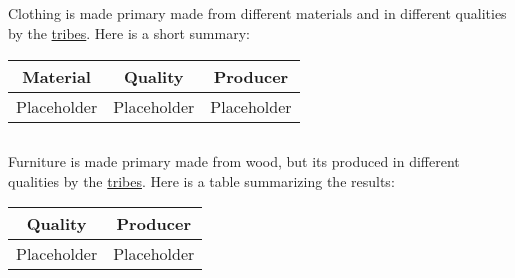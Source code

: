 \subsection{}\label{ch:Goods:Merchandise:Clothing}

\Gls{Clothing} is made primary made from different materials and in different qualities by the
\hyperref[ch:Tribes]{tribes}. Here is a short summary:

\begin{longtable}{ccc}
	\toprule
	Material    & Quality     & Producer    \\
	\midrule
	Placeholder & Placeholder & Placeholder \\
	\bottomrule
\end{longtable}

\subsection{}\label{ch:Goods:Merchandise:Furniture}

\Gls{Furniture} is made primary made from wood, but its produced in different qualities by the
\hyperref[ch:Tribes]{tribes}. Here is a table summarizing the results:

\begin{longtable}{cc}
	\toprule
	Quality     & Producer    \\
	\midrule
	Placeholder & Placeholder \\
	\bottomrule
\end{longtable}
